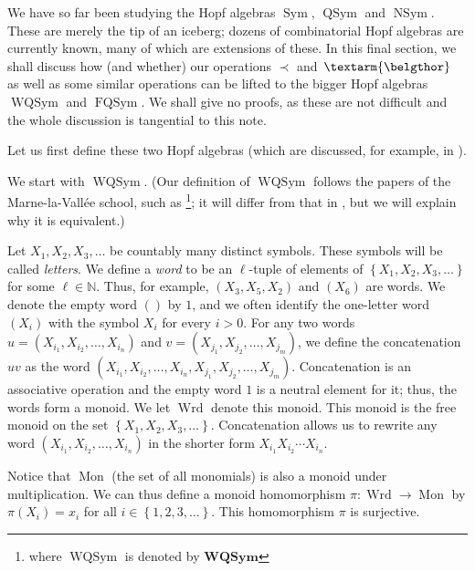 \documentclass[numbers=enddot,12pt,final,onecolumn,notitlepage,abstracton]{scrartcl}%
\theoremstyle{definition}
\newcommand{\bel}{\left. \textarm{\belgthor} \right.}
\begin{document}
We have so far been studying the Hopf algebras $\operatorname*{Sym}$,
$\operatorname*{QSym}$ and $\operatorname*{NSym}$. These are merely the tip of
an iceberg; dozens of combinatorial Hopf algebras are currently known, many of
which are extensions of these. In this final section, we shall discuss how
(and whether) our operations $\left.  \prec\right.  $ and $\bel $ as well as
some similar operations can be lifted to the bigger Hopf algebras
$\operatorname*{WQSym}$ and $\operatorname*{FQSym}$. We shall give no proofs,
as these are not difficult and the whole discussion is tangential to this note.

Let us first define these two Hopf algebras (which are discussed, for example,
in \cite{FM}).

We start with $\operatorname*{WQSym}$. (Our definition of
$\operatorname*{WQSym}$ follows the papers of the Marne-la-Vall\'{e}e school,
such as \cite[Section 5.1]{AFNT}\footnote{where $\operatorname*{WQSym}$ is
denoted by $\mathbf{WQSym}$}; it will differ from that in \cite{FM}, but we
will explain why it is equivalent.)

Let $X_{1},X_{2},X_{3},\ldots$ be countably many distinct symbols. These
symbols will be called \textit{letters}. We define a \textit{word} to be an
$\ell$-tuple of elements of $\left\{  X_{1},X_{2},X_{3},\ldots\right\}  $ for
some $\ell\in\mathbb{N}$. Thus, for example, $\left(  X_{3},X_{5}%
,X_{2}\right)  $ and $\left(  X_{6}\right)  $ are words. We denote the empty
word $\left(  {}\right)  $ by $1$, and we often identify the one-letter word
$\left(  X_{i}\right)  $ with the symbol $X_{i}$ for every $i>0$. For any two
words $u=\left(  X_{i_{1}},X_{i_{2}},\ldots,X_{i_{n}}\right)  $ and $v=\left(
X_{j_{1}},X_{j_{2}},\ldots,X_{j_{m}}\right)  $, we define the concatenation
$uv$ as the word \newline$\left(  X_{i_{1}},X_{i_{2}},\ldots,X_{i_{n}%
},X_{j_{1}},X_{j_{2}},\ldots,X_{j_{m}}\right)  $. Concatenation is an
associative operation and the empty word $1$ is a neutral element for it;
thus, the words form a monoid. We let $\operatorname*{Wrd}$ denote this
monoid. This monoid is the free monoid on the set $\left\{  X_{1},X_{2}%
,X_{3},\ldots\right\}  $. Concatenation allows us to rewrite any word $\left(
X_{i_{1}},X_{i_{2}},\ldots,X_{i_{n}}\right)  $ in the shorter form $X_{i_{1}%
}X_{i_{2}}\cdots X_{i_{n}}$.

Notice that $\operatorname*{Mon}$ (the set of all monomials) is also a monoid
under multiplication. We can thus define a monoid homomorphism $\pi
:\operatorname*{Wrd}\rightarrow\operatorname*{Mon}$ by $\pi\left(
X_{i}\right)  =x_{i}$ for all $i\in\left\{  1,2,3,\ldots\right\}  $. This
homomorphism $\pi$ is surjective.
\end{document}
